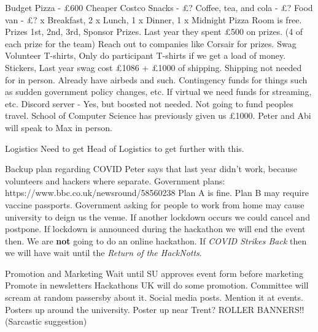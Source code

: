 \documentclass[11pt,hacksoc,agenda]{meetingmins}
\begin{document}
\begin{items}
  \item Budget
  \subitem Pizza - \pounds600
  \subitem Cheaper Costco Snacks - \pounds?
  \subitem Coffee, tea, and cola - \pounds?
  \subitem Food van - \pounds?
   x Breakfast, 2 x Lunch, 1 x Dinner, 1 x Midnight Pizza
  \subitem Room is free.
  \subitem Prizes
  \subsubitem 1st, 2nd, 3rd, Sponsor Prizes.
  \subsubitem Last year they spent \pounds500 on prizes. (4 of each prize for the team)
  \subsubitem Reach out to companies like Corsair for prizes.
  \subitem Swag
  \subsubitem Volunteer T-shirts,
  \subsubitem Only do participant T-shirts if we get a load of money.
  \subsubitem Stickers,
  \subsubitem Last year swag cost \pounds1086 + \pounds1000 of shipping.
  \subsubitem Shipping not needed for in person.
  \subitem Already have airbeds and such.
  \subitem Contingency funds for things such as sudden government policy changes, etc.
  \subitem If virtual we need funds for streaming, etc.
  \subitem Discord server - Yes, but boosted not needed.
  \subitem Not going to fund peoples travel.
  \subitem School of Computer Science has previously given us \pounds1000.
  \subsubitem Peter and Abi will speak to Max in person.

  \item Logistics
  \subitem Need to get Head of Logistics to get further with this.

  \item Backup plan regarding COVID
  \subitem Peter says that last year didn't work, because volunteers and hackers where separate.
  \subitem Government plans: https://www.bbc.co.uk/newsround/58560238
  \subitem Plan A is fine.
  \subitem Plan B may require vaccine passports.
  \subitem Government asking for people to work from home may cause university to deign us the venue.
  \subitem If another lockdown occurs we could cancel and postpone.
  \subitem If lockdown is announced during the hackathon we will end the event then.
  \subitem We are \textbf{not} going to do an online hackathon. If \textit{COVID Strikes Back} then we will have wait until the \textit{Return of the HackNotts}.

  \item Promotion and Marketing
  \subitem Wait until SU approves event form before marketing
  \subitem Promote in newsletters
  \subitem Hackathons UK will do some promotion.
  \subitem Committee will scream at random passersby about it.
  \subitem Social media posts.
  \subitem Mention it at events.
  \subitem Posters up around the university.
  \subitem Poster up near Trent?
  \subitem ROLLER BANNERS!! (Sarcastic suggestion)


\end{items}
\end{document}
